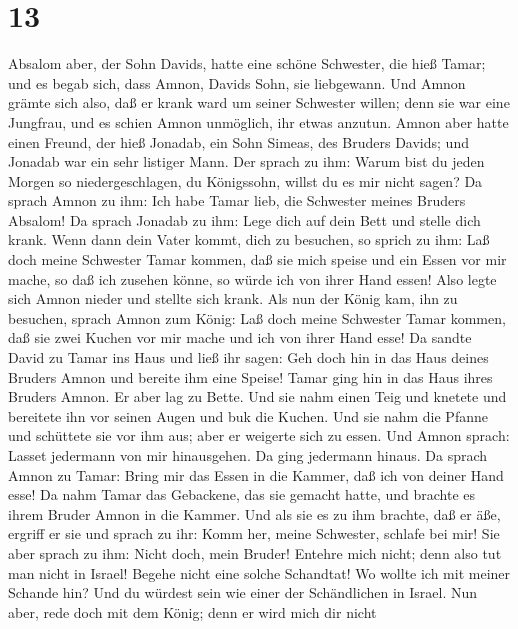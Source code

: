 \hypertarget{section-12}{%
\section{13}\label{section-12}}

 Absalom aber, der Sohn Davids, hatte eine schöne
Schwester, die hieß Tamar; und es begab sich, dass Amnon, Davids Sohn,
sie liebgewann.  Und Amnon grämte sich also, daß er krank
ward um seiner Schwester willen; denn sie war eine Jungfrau, und es
schien Amnon unmöglich, ihr etwas anzutun.  Amnon aber
hatte einen Freund, der hieß Jonadab, ein Sohn Simeas, des Bruders
Davids; und Jonadab war ein sehr listiger Mann.  Der
sprach zu ihm: Warum bist du jeden Morgen so niedergeschlagen, du
Königssohn, willst du es mir nicht sagen? Da sprach Amnon zu ihm: Ich
habe Tamar lieb, die Schwester meines Bruders Absalom!  Da
sprach Jonadab zu ihm: Lege dich auf dein Bett und stelle dich krank.
Wenn dann dein Vater kommt, dich zu besuchen, so sprich zu ihm: Laß doch
meine Schwester Tamar kommen, daß sie mich speise und ein Essen vor mir
mache, so daß ich zusehen könne, so würde ich von ihrer Hand essen!
 Also legte sich Amnon nieder und stellte sich krank. Als
nun der König kam, ihn zu besuchen, sprach Amnon zum König: Laß doch
meine Schwester Tamar kommen, daß sie zwei Kuchen vor mir mache und ich
von ihrer Hand esse!  Da sandte David zu Tamar ins Haus
und ließ ihr sagen: Geh doch hin in das Haus deines Bruders Amnon und
bereite ihm eine Speise!  Tamar ging hin in das Haus ihres
Bruders Amnon. Er aber lag zu Bette. Und sie nahm einen Teig und knetete
und bereitete ihn vor seinen Augen und buk die Kuchen. 
Und sie nahm die Pfanne und schüttete sie vor ihm aus; aber er weigerte
sich zu essen. Und Amnon sprach: Lasset jedermann von mir hinausgehen.
Da ging jedermann hinaus.  Da sprach Amnon zu Tamar:
Bring mir das Essen in die Kammer, daß ich von deiner Hand esse! Da nahm
Tamar das Gebackene, das sie gemacht hatte, und brachte es ihrem Bruder
Amnon in die Kammer.  Und als sie es zu ihm brachte, daß
er äße, ergriff er sie und sprach zu ihr: Komm her, meine Schwester,
schlafe bei mir!  Sie aber sprach zu ihm: Nicht doch,
mein Bruder! Entehre mich nicht; denn also tut man nicht in Israel!
Begehe nicht eine solche Schandtat!  Wo wollte ich mit
meiner Schande hin? Und du würdest sein wie einer der Schändlichen in
Israel. Nun aber, rede doch mit dem König; denn er wird mich dir nicht
